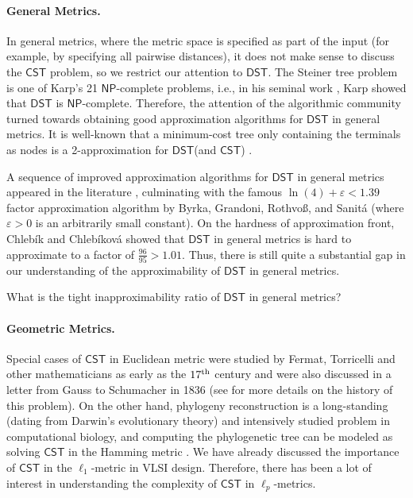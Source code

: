 \documentclass{theoretics}
\newcommand{\1}{\textbf{1}}
\newcommand{\cst}{$\mathsf{CST}$\xspace}
\newcommand{\dst}{$\mathsf{DST}$\xspace}
\newcommand{\np}{$\mathsf{NP}$\xspace}
\begin{document}
\paragraph{General Metrics.}
  In general metrics, where the metric space is specified as part of the input (for example, by specifying all pairwise distances), it does not make sense to discuss the \cst problem, so we restrict our attention to \dst. The Steiner tree problem is one of Karp's 21 \np-complete problems, i.e., in his seminal work \cite{karp1972reducibility},  Karp showed that \dst is \np-complete. Therefore, the attention of the algorithmic community turned towards obtaining good approximation algorithms for \dst in general metrics. It is well-known that a minimum-cost
tree only containing the terminals as nodes is a 2-approximation for \dst (and \cst) \cite{Gilbert_Pollak_1968,Vazirani_2001}.

A sequence of improved approximation algorithms for \dst in general metrics appeared in the literature \cite{zelikovsky199311,karpinski1997new,promel2000new,robins2005tighter}, culminating with the famous $\ln(4)+\varepsilon<1.39$ factor approximation algorithm by Byrka, Grandoni, Rothvo{\ss}, and Sanit\'a \cite{byrka2013steiner} (where $\varepsilon>0$ is an arbitrarily small constant). On the hardness of approximation front, Chleb\'ik and Chleb\'ikov\'a \cite{Chlebik_Chlebikova_2008} showed that \dst in general metrics is hard to approximate to a factor of $\frac{96}{95}>1.01$. Thus, there is still quite a substantial gap in our understanding of the approximability of \dst in general metrics. 

 
\begin{openq}What is the tight inapproximability ratio of \dst in general metrics? \label{open1}\end{openq}

\paragraph{Geometric Metrics.}
Special cases of \cst in Euclidean metric were studied by Fermat, Torricelli and other mathematicians
as early as the $17\textsuperscript{th} $ 
century and were also discussed in a letter from  Gauss to Schumacher in 1836 (see \cite{brazil2014history} for more details on the history of this problem). 
On the other hand, phylogeny reconstruction  is a long-standing (dating from Darwin’s evolutionary theory) and
intensively studied problem in computational biology, and computing the phylogenetic
tree can be modeled as solving \cst in the Hamming metric \cite{foulds1982steiner}. We have already discussed the importance of \cst in the $\ell_1$-metric in VLSI design. Therefore, there has been a lot of interest in understanding the complexity of \cst in $\ell_p$-metrics.  
\end{document}
